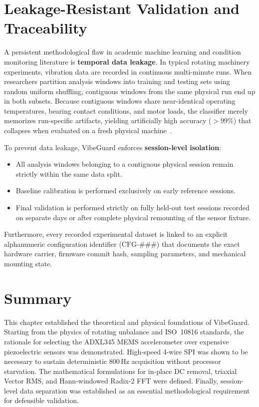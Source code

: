 \section{Leakage-Resistant Validation and Traceability}
A persistent methodological flaw in academic machine learning and condition monitoring literature is \textbf{temporal data leakage}. In typical rotating machinery experiments, vibration data are recorded in continuous multi-minute runs. When researchers partition analysis windows into training and testing sets using random uniform shuffling, contiguous windows from the same physical run end up in both subsets. Because contiguous windows share near-identical operating temperatures, bearing contact conditions, and motor loads, the classifier merely memorizes run-specific artifacts, yielding artificially high accuracy ($>99\%$) that collapses when evaluated on a fresh physical machine~\cite{vibeguard_playbook2026}.

To prevent data leakage, VibeGuard enforces \textbf{session-level isolation}:
\begin{itemize}
    \item All analysis windows belonging to a contiguous physical session remain strictly within the same data split.
    \item Baseline calibration is performed exclusively on early reference sessions.
    \item Final validation is performed strictly on fully held-out test sessions recorded on separate days or after complete physical remounting of the sensor fixture.
\end{itemize}
Furthermore, every recorded experimental dataset is linked to an explicit alphanumeric configuration identifier ($\mathrm{CFG}\text{-}\#\#\#$) that documents the exact hardware carrier, firmware commit hash, sampling parameters, and mechanical mounting state.

\section{Summary}
This chapter established the theoretical and physical foundations of VibeGuard. Starting from the physics of rotating unbalance and ISO~10816 standards, the rationale for selecting the ADXL345 MEMS accelerometer over expensive piezoelectric sensors was demonstrated. High-speed 4-wire SPI was shown to be necessary to sustain deterministic 800\,Hz acquisition without processor starvation. The mathematical formulations for in-place DC removal, triaxial Vector RMS, and Hann-windowed Radix-2 FFT were defined. Finally, session-level data separation was established as an essential methodological requirement for defensible validation.
